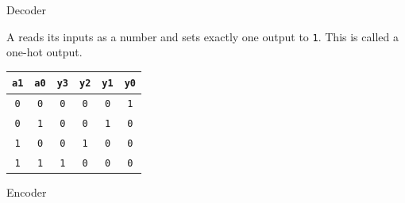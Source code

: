 \documentclass[mathserif, handout]{beamer}
\newcommand{\ttab}[1]{\texttt{#1}}
\begin{document}
\begin{frame}{Decoder}
  \begin{center}
    \Large {}
  \end{center}
\end{frame}

\begin{frame}
  A  reads its inputs as a number and sets exactly one output to \ttab{1}. This is called a one-hot output.\\[3mm]
  \begin{minipage}{0.45\textwidth}
    \centering
  \end{minipage}%
  \begin{minipage}{0.55\textwidth}
    \centering
    \renewcommand{\arraystretch}{1.2}
    \begin{tabular}{cc|cccc}
      \ttab{a1} & \ttab{a0} & \ttab{y3} & \ttab{y2} & \ttab{y1} & \ttab{y0} \\ \hline
      \ttab{0} & \ttab{0} & \ttab{0} & \ttab{0} & \ttab{0} & \ttab{1} \\
      \ttab{0} & \ttab{1} & \ttab{0} & \ttab{0} & \ttab{1} & \ttab{0} \\
      \ttab{1} & \ttab{0} & \ttab{0} & \ttab{1} & \ttab{0} & \ttab{0} \\
      \ttab{1} & \ttab{1} & \ttab{1} & \ttab{0} & \ttab{0} & \ttab{0} \\
    \end{tabular}
  \end{minipage}
\end{frame}

\begin{frame}{Encoder}
  \begin{center}
    \Large {}
  \end{center}
\end{frame}
\end{document}
